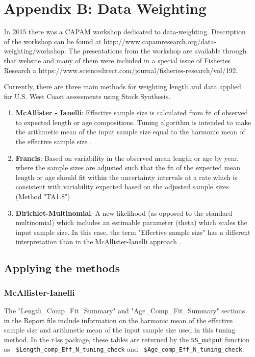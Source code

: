 \section{Appendix B: Data Weighting}
\label{sec:DataWeight}

\begin{sloppypar}
In 2015 there was a CAPAM workshop dedicated to data-weighting. Description of the workshop can be found at http://www.capamresearch.org/data-weighting/workshop. The presentations from the workshop are available through that website and many of them were included in a special issue of Fisheries Research a https://www.sciencedirect.com/journal/fisheries-research/vol/192.
\end{sloppypar}

Currently, there are three main methods for weighting length and data applied for U.S. West Coast assessments using Stock Synthesis.

\begin{enumerate}
	\item \textbf{McAllister - Ianelli}: Effective sample size is calculated from fit of observed to expected length or age compositions. Tuning algorithm is intended to make the arithmetic mean of the input sample size equal to the harmonic mean of the effective sample size \citep{mcallister_bayesian_1997}.
	
	\item \textbf{Francis}: Based on variability in the observed mean length or age by year, where the sample sizes are adjusted such that the fit of the expected mean length or age should fit within the uncertainty intervals at a rate which is consistent with variability expected based on the adjusted sample sizes (Method "TA1.8") \citep{francis_data_2011}
	
	\item \textbf{Dirichlet-Multinomial}: A new likelihood (as opposed to the standard multinomial) which includes an estimable parameter (theta) which scales the input sample size. In this case, the term "Effective sample size" has a different interpretation than in the McAllister-Ianelli approach \citep{thorson_model-based_2017}.
\end{enumerate}

\subsection{Applying the methods}

\subsubsection{McAllister-Ianelli}
The "Length\_Comp\_Fit\_Summary" and "Age\_Comp\_Fit\_Summary" sections in the Report file include information on the harmonic mean of the effective sample size and arithmetic mean of the input sample size used in this tuning method. In the r4ss package, these tables are returned by the \texttt{SS\_output} function as \texttt{ \$Length\_comp\_Eff\_N\_tuning\_check} and \texttt{ \$Age\_comp\_Eff\_N\_tuning\_check}.

